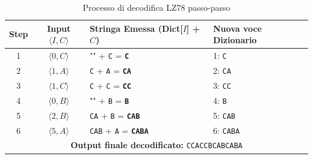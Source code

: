\begin{table}[H]
\centering
\begin{tabular}{|c|c|l|l|}
\hline
\textbf{Step} & \textbf{Input $\langle I, C \rangle$} & \textbf{Stringa Emessa (Dict[$I$] + $C$)} & \textbf{Nuova voce Dizionario} \\
\hline
1 & $\langle 0, C \rangle$ & "" + \texttt{C} = \textbf{\texttt{C}} & 1: \texttt{C} \\
2 & $\langle 1, A \rangle$ & \texttt{C} + \texttt{A} = \textbf{\texttt{CA}} & 2: \texttt{CA} \\
3 & $\langle 1, C \rangle$ & \texttt{C} + \texttt{C} = \textbf{\texttt{CC}} & 3: \texttt{CC} \\
4 & $\langle 0, B \rangle$ & "" + \texttt{B} = \textbf{\texttt{B}} & 4: \texttt{B} \\
5 & $\langle 2, B \rangle$ & \texttt{CA} + \texttt{B} = \textbf{\texttt{CAB}} & 5: \texttt{CAB} \\
6 & $\langle 5, A \rangle$ & \texttt{CAB} + \texttt{A} = \textbf{\texttt{CABA}} & 6: \texttt{CABA} \\
\hline
\multicolumn{4}{|c|}{\textbf{Output finale decodificato:} \texttt{CCACCBCABCABA}} \\
\hline
\end{tabular}
\caption{Processo di decodifica LZ78 passo-passo}
\end{table}